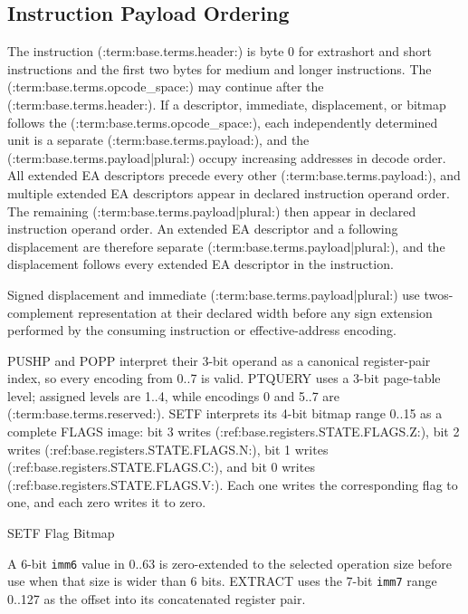 \subsection{Instruction Payload Ordering}
The instruction (:term:base.terms.header:) is byte 0 for extrashort and short instructions and the first two bytes for medium and
longer instructions. The (:term:base.terms.opcode_space:) may continue after the (:term:base.terms.header:). If a descriptor, immediate, displacement, or
bitmap follows the (:term:base.terms.opcode_space:), each independently determined unit is a separate (:term:base.terms.payload:), and the (:term:base.terms.payload|plural:) occupy
increasing addresses in decode order. All extended EA descriptors precede every other (:term:base.terms.payload:), and multiple
extended EA descriptors appear in declared instruction operand order. The remaining (:term:base.terms.payload|plural:) then appear in declared
instruction operand order. An extended EA descriptor and a following displacement are therefore separate (:term:base.terms.payload|plural:),
and the displacement follows every extended EA descriptor in the instruction.

Signed displacement and immediate (:term:base.terms.payload|plural:) use two\textquotesingle{}s-complement representation at their declared width before any
sign extension performed by the consuming instruction or effective-address encoding.



PUSHP and POPP interpret their 3-bit operand as a canonical register-pair index, so every encoding
from 0..7 is valid.
PTQUERY uses a 3-bit page-table level; assigned levels are 1..4, while encodings 0 and 5..7
are (:term:base.terms.reserved:).
SETF interprets its 4-bit bitmap range 0..15 as a complete FLAGS
image: bit 3 writes (:ref:base.registers.STATE.FLAGS.Z:), bit 2 writes (:ref:base.registers.STATE.FLAGS.N:), bit 1 writes (:ref:base.registers.STATE.FLAGS.C:), and bit 0 writes (:ref:base.registers.STATE.FLAGS.V:). Each one writes the corresponding flag to
one, and each zero writes it to zero.

\begin{BedrockListedFormatDiagram}{SETF Flag Bitmap}
\end{BedrockListedFormatDiagram}

A 6-bit \texttt{imm6} value in 0..63 is zero-extended to the selected operation size before use when
that size is wider than 6 bits. EXTRACT uses the 7-bit \texttt{imm7} range 0..127 as the
offset into its concatenated register pair.
